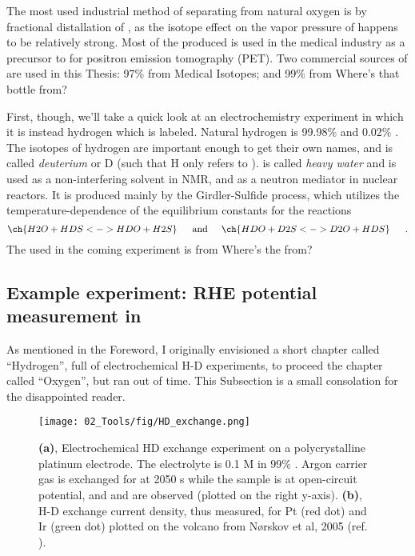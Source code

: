 The most used industrial method of separating  from natural oxygen is by fractional distallation of , as the isotope effect on the vapor pressure of  happens to be relatively strong\cite{Disbudak2018}. Most of the  produced is used in the medical industry as a precursor to  for positron emission tomography (PET).  Two commercial sources of  are used in this Thesis: 97\%  from Medical Isotopes; and 99\%  from \todo Where's that bottle from?

First, though, we'll take a quick look at an electrochemistry experiment in which it is instead hydrogen which is labeled. Natural hydrogen is 99.98\%  and 0.02\% . The isotopes of hydrogen are important enough to get their own names, and  is called \textit{deuterium} or D (such that H only refers to ).  is called \textit{heavy water} and is used as a non-interfering solvent in NMR, and as a neutron mediator in nuclear reactors. It is produced mainly by the Girdler-Sulfide process, which utilizes the temperature-dependence of the equilibrium constants for the reactions\cite{Agarwal2016}
\begin{equation}
\ch{H2O + HDS <-> HDO + H2S}\,\hspace{5mm}\text{and}\hspace{5mm}\ch{HDO + D2S <-> D2O + HDS}\hspace{5mm}\,.
\end{equation} 
The  used in the coming experiment is from \todo Where's the  from?


\subsection{Example experiment: RHE potential measurement in }\label{subsec:isotope_RHE}
As mentioned in the Foreword, I originally envisioned a short chapter called ``Hydrogen'', full of electrochemical H-D experiments, to proceed the chapter called ``Oxygen'', but ran out of time. This Subsection is a small consolation for the disappointed reader.

\begin{figure}[h!]
	\centering
	\texttt{[image: 02\_Tools/fig/HD\_exchange.png]}
	\caption{\textbf{(a)}, Electrochemical HD exchange experiment on a polycrystalline platinum electrode. The electrolyte is 0.1 M  in 99\% . Argon carrier gas is exchanged for  at 2050 s while the sample is at open-circuit potential, and  and  are observed (plotted on the right y-axis). \textbf{(b)}, H-D exchange current density, thus measured, for Pt (red dot) and Ir (green dot) plotted on the volcano from N\o rskov et al, 2005 (ref. \cite{Nørskov2005a}).}
	\label{fig:HD}
\end{figure}

